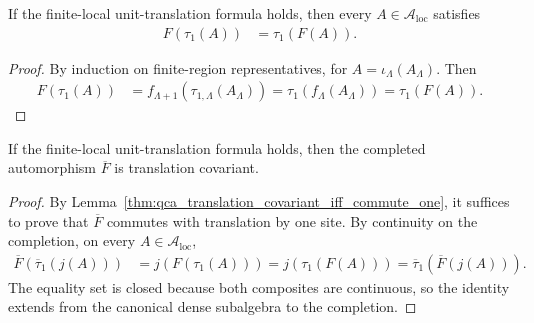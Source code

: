 \begin{lemma}
    \label{lem:qca_compatible_algebraic_unit_translation}
    \leanok
    If the finite-local unit-translation formula holds, then every
    $A\in\mathcal A_{\mathrm{loc}}$ satisfies
    \begin{align}
        F(\tau_1(A)) & =\tau_1(F(A)).
    \end{align}
\end{lemma}

\begin{proof}\leanok
    By induction on finite-region representatives, for
    $A=\iota_\Lambda(A_\Lambda)$.  Then
    \begin{align}
        F(\tau_1(A))
         & =f_{\Lambda+1}(\tau_{1,\Lambda}(A_\Lambda))
        =\tau_1(f_\Lambda(A_\Lambda))
        =\tau_1(F(A)).
    \end{align}
\end{proof}

\begin{lemma}
    \label{thm:qca_compatible_translation_covariant}
    \leanok
    If the finite-local unit-translation formula holds, then the completed
    automorphism $\overline F$ is translation covariant.
\end{lemma}

\begin{proof}\leanok
    By Lemma~\ref{thm:qca_translation_covariant_iff_commute_one}, it suffices
    to prove that $\overline F$ commutes with translation by one site.  By continuity
    on the completion, on every $A\in\mathcal A_{\mathrm{loc}}$,
    \begin{align}
        \overline F(\overline\tau_1(j(A)))
         & =j(F(\tau_1(A)))
        =j(\tau_1(F(A)))
        =\overline\tau_1(\overline F(j(A))).
    \end{align}
    The equality set is closed because both composites are continuous, so the
    identity extends from the canonical dense subalgebra to the completion.
\end{proof}

